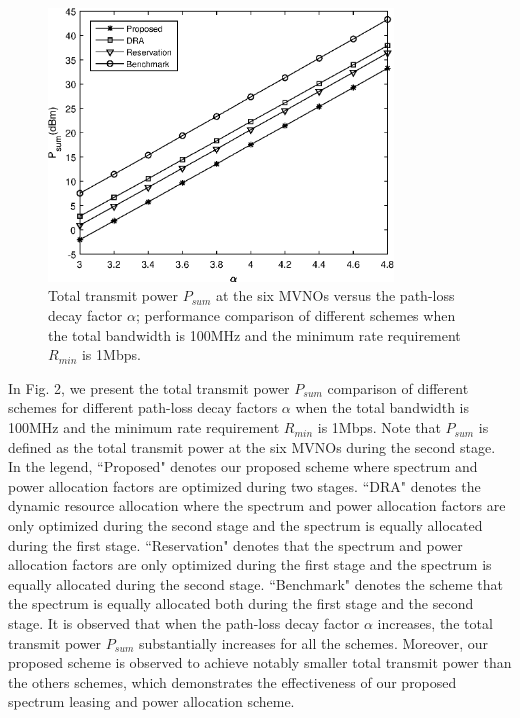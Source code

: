 \documentclass[journal]{IEEEtran}
\begin{document}
\begin{figure}
	\centering
	\includegraphics[width=3.6in]{P_alpha.eps}
	\caption{Total transmit power $P_{sum}$ at the six MVNOs versus the path-loss decay factor $\alpha$; performance comparison of different schemes when the total bandwidth is 100MHz and the minimum rate requirement $R_{min}$ is 1Mbps.}
\end{figure}
In Fig. 2, we present the total transmit power $P_{sum}$ comparison of different schemes for different path-loss decay factors $\alpha$ when the total bandwidth is 100MHz and the minimum rate requirement $R_{min}$ is 1Mbps. Note that $P_{sum}$ is defined as the total transmit power at the six MVNOs during the second stage. In the legend, ``Proposed" denotes our proposed scheme where spectrum and power allocation factors are optimized during two stages. ``DRA" denotes the dynamic resource allocation where the spectrum and power allocation factors are only optimized during the second stage and the spectrum is equally allocated during the first stage. ``Reservation" denotes that the spectrum and power allocation factors are only optimized during the first stage and the spectrum is equally allocated during the second stage. ``Benchmark" denotes the scheme that the spectrum is equally allocated both during the first stage and the second stage. It is observed that when the path-loss decay factor $\alpha$ increases, the total transmit power $P_{sum}$ substantially increases for all the schemes. Moreover, our proposed scheme is observed to achieve notably smaller total transmit power than the others schemes, which demonstrates the effectiveness of our proposed spectrum leasing and power allocation scheme.
\end{document}
